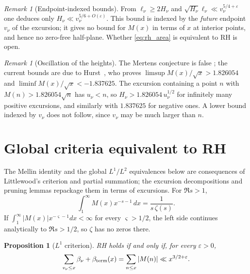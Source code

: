 \documentclass[11pt]{amsart}
\numberwithin{equation}{section}
\theoremstyle{plain}
\newtheorem{proposition}[theorem]{Proposition}
\theoremstyle{definition}
\theoremstyle{remark}
\newtheorem{remark}[theorem]{Remark}
\newcommand{\eps}{\varepsilon}
\begin{document}
\begin{remark}[Endpoint-indexed bounds]
\label{rem:onedirection}
From $\ell_\nu\ge2H_\nu$ and $\sqrt{H_\nu}\ell_\nu\ll v_\nu^{5/4+\eps}$ one
deduces only $H_\nu\ll v_\nu^{5/6+O(\eps)}$. This bound is indexed by the
\emph{future} endpoint $v_\nu$ of the excursion; it gives no bound for $M(x)$
in terms of $x$ at interior points, and hence no zero-free half-plane.
Whether \eqref{eq:rh_area} is equivalent to RH is open.
\end{remark}

\begin{remark}[Oscillation of the heights]
\label{rem:omega}
The Mertens conjecture is false \cite{OdlyzkoTeRiele1985,KotnikTeRiele2006};
the current bounds are due to Hurst~\cite{Hurst18}, who proves
$\limsup M(x)/\sqrt{x}>1.826054$ and
$\liminf M(x)/\sqrt{x}<-1.837625$. The excursion containing a point $n$ with
$M(n)>1.826054\sqrt n$ has $u_\nu<n$, so $H_\nu>1.826054\,u_\nu^{1/2}$ for
infinitely many positive excursions, and similarly with $1.837625$ for
negative ones. A lower bound indexed by $v_\nu$ does not follow, since
$v_\nu$ may be much larger than $n$.
\end{remark}

\section{Global criteria equivalent to RH}
\label{sec:criteria}

The Mellin identity and the global $L^1/L^2$ equivalences below are
consequences of Littlewood's criterion and partial summation; the excursion
decompositions and pruning lemmas repackage them in terms of excursions.
For $\Re s>1$,
\begin{equation}
\label{eq:mellin_M}
  \int_1^\infty M(x)x^{-s-1}\,dx=\frac{1}{s\,\zeta(s)} .
\end{equation}
If $\int_1^\infty|M(x)|x^{-\varsigma-1}dx<\infty$ for every $\varsigma>1/2$, the
left side continues analytically to $\Re s>1/2$, so $\zeta$ has no zeros
there.

\begin{proposition}[$L^1$ criterion]
\label{prop:L1}
RH holds if and only if, for every $\eps>0$,
\begin{equation}
\label{eq:L1_criterion}
  \sum_{v_\nu\le x}\beta_\nu+\beta_{\rm term}(x)=\sum_{n\le x}|M(n)|
  \ll x^{3/2+\eps}.
\end{equation}
\end{proposition}
\end{document}
